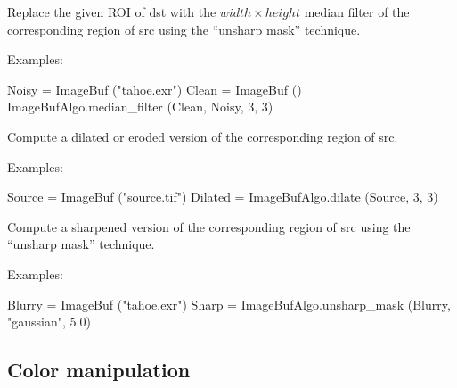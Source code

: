 Replace the given ROI of {\cf dst} with the
${\mathit width} \times {\mathit height}$ median filter of the corresponding
region of {\cf src} using the ``unsharp mask'' technique.

\smallskip
\noindent Examples:
\begin{code}
    Noisy = ImageBuf ("tahoe.exr")
    Clean = ImageBuf ()
    ImageBufAlgo.median_filter (Clean, Noisy, 3, 3)
\end{code}
\apiend


 
 

Compute a dilated or eroded version of the corresponding region of {\cf src}.

\smallskip
\noindent Examples:
\begin{code}
    Source = ImageBuf ("source.tif")
    Dilated = ImageBufAlgo.dilate (Source, 3, 3)
\end{code}
\apiend


 

Compute a sharpened version of the corresponding region of {\cf src} using
the ``unsharp mask'' technique.

\smallskip
\noindent Examples:
\begin{code}
    Blurry = ImageBuf ("tahoe.exr")
    Sharp = ImageBufAlgo.unsharp_mask (Blurry, "gaussian", 5.0)
\end{code}
\apiend



\subsection{Color manipulation}
\label{sec:iba:py:color}


